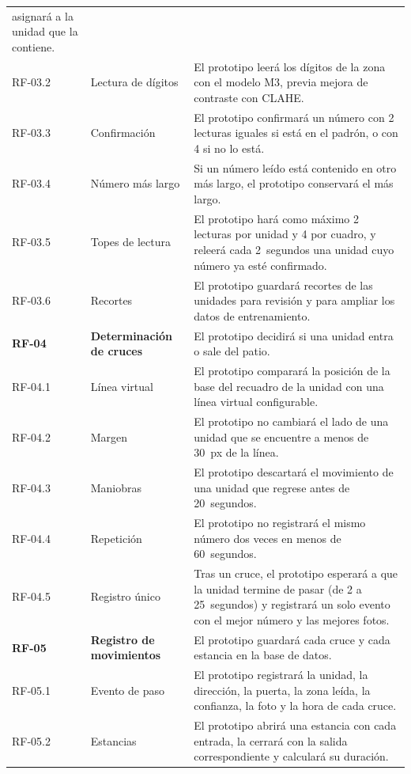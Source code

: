 {\begin{longtable}{@{}L{1.5cm}L{3.6cm}L{8.9cm}@{}}
    asignará a la unidad que la contiene. \\
  RF-03.2 & Lectura de dígitos & El prototipo leerá los dígitos de la zona
    con el modelo M3, previa mejora de contraste con CLAHE. \\
  RF-03.3 & Confirmación & El prototipo confirmará un número con 2 lecturas
    iguales si está en el padrón, o con 4 si no lo está. \\
  RF-03.4 & Número más largo & Si un número leído está contenido en otro
    más largo, el prototipo conservará el más largo. \\
  RF-03.5 & Topes de lectura & El prototipo hará como máximo 2 lecturas
    por unidad y 4 por cuadro, y releerá cada 2~segundos una unidad cuyo
    número ya esté confirmado. \\
  RF-03.6 & Recortes & El prototipo guardará recortes de las unidades para
    revisión y para ampliar los datos de entrenamiento. \\
  \midrule
  \textbf{RF-04} & \textbf{Determinación de cruces} & El prototipo decidirá
    si una unidad entra o sale del patio. \\
  RF-04.1 & Línea virtual & El prototipo comparará la posición de la base
    del recuadro de la unidad con una línea virtual configurable. \\
  RF-04.2 & Margen & El prototipo no cambiará el lado de una unidad que se
    encuentre a menos de 30~px de la línea. \\
  RF-04.3 & Maniobras & El prototipo descartará el movimiento de una unidad
    que regrese antes de 20~segundos. \\
  RF-04.4 & Repetición & El prototipo no registrará el mismo número dos
    veces en menos de 60~segundos. \\
  RF-04.5 & Registro único & Tras un cruce, el prototipo esperará a que la
    unidad termine de pasar (de 2 a 25~segundos) y registrará un solo
    evento con el mejor número y las mejores fotos. \\
  \midrule
  \textbf{RF-05} & \textbf{Registro de movimientos} & El prototipo guardará
    cada cruce y cada estancia en la base de datos. \\
  RF-05.1 & Evento de paso & El prototipo registrará la unidad, la
    dirección, la puerta, la zona leída, la confianza, la foto y la hora
    de cada cruce. \\
  RF-05.2 & Estancias & El prototipo abrirá una estancia con cada entrada,
    la cerrará con la salida correspondiente y calculará su duración. \\

\end{longtable}}
